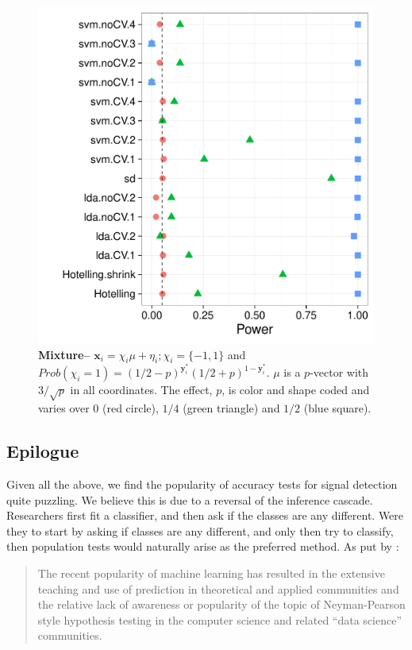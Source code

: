 \documentclass[12pt,a4paper]{article}
\theoremstyle{definition}
\newcommand{\set}[1]{\{ #1 \}} %
\newcommand{\prob}[1]{Prob( #1 )} %
\newcommand{\rv}[1]{\mathbf{#1}} %
\newcommand{\x}{\rv x} %
\newcommand{\y}{\rv y} %
\begin{document}
\begin{figure}[ht]
\centering
	  \includegraphics[width=0.7\linewidth]{"art/2016-08-08 07:33:05"}
	  \caption{\textbf{Mixture--} $\x_i = \chi_i \mu + \eta_i; \chi_i = \set{-1,1}$ and $\prob{\chi_i=1}=(1/2-p)^{\y^*_i}  (1/2+p)^{1-\y^*_i}$. $\mu$ is a $p$-vector with $3/\sqrt{p}$ in all coordinates.
	  The effect, $p$, is color and shape coded and varies over $0$ (red circle), $1/4$ (green triangle) and $1/2$ (blue square). }
	\label{fig:golland}
\end{figure}










\subsection{Epilogue}
Given all the above, we find the popularity of accuracy tests for signal detection quite puzzling. 
We believe this is due to a reversal of the inference cascade. 
Researchers first fit a classifier, and then ask if the classes are any different.
Were they to start by asking if classes are any different, and only then try to classify, then population tests would naturally arise as the preferred method. 
As put by \cite{ramdas_classification_2016}:
\begin{quote}
The recent popularity of machine learning has resulted in the extensive teaching and use
of prediction in theoretical and applied communities and the relative lack of awareness or
popularity of the topic of Neyman-Pearson style hypothesis testing in the computer science
and related ``data science'' communities.
\end{quote}
\end{document}
